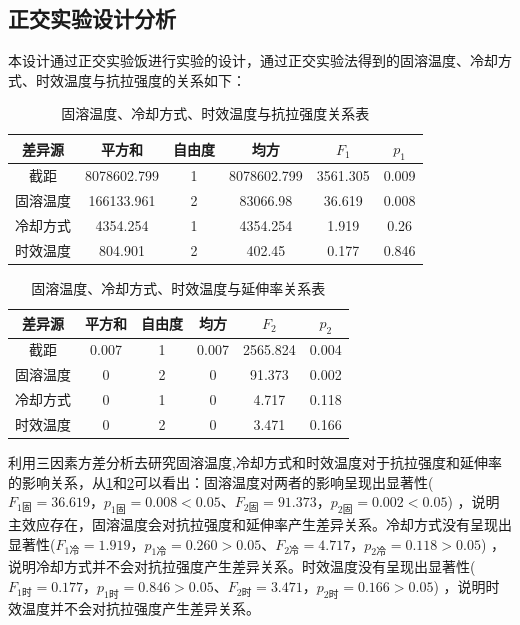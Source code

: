 \subsection{正交实验设计分析}
本设计通过正交实验饭进行实验的设计，通过正交实验法得到的固溶温度、冷却方式、时效温度与抗拉强度的关系如下：
\begin{table}[htbp]
	\centering
	\caption{固溶温度、冷却方式、时效温度与抗拉强度关系表}
	\label{sec:zjq}
	\begin{tabular}{cccccc}
		\toprule
		差异源 & 平方和 & 自由度 & 均方 & $ F_1 $ & $ p_1 $ \\
		\midrule
		截距 & 8078602.799 & 1 & 8078602.799 & 3561.305 & 0.009 \\
		固溶温度 & 166133.961 & 2 & 83066.98 & 36.619 & 0.008 \\
		冷却方式 & 4354.254 & 1 & 4354.254 & 1.919 & 0.26 \\
		时效温度 & 804.901 & 2 & 402.45 & 0.177 & 0.846 \\
		\bottomrule
	\end{tabular}
\end{table}
\begin{table}[htbp]
	\centering
	\caption{固溶温度、冷却方式、时效温度与延伸率关系表}
	\label{sec:zjy}
	\begin{tabular}{cccccc}
		\toprule
		差异源 & 平方和 & 自由度 & 均方 & $ F_2 $ & $ p_2 $ \\
		\midrule
		截距 & 0.007 & 1 & 0.007 & 2565.824 & 0.004 \\
		固溶温度 & 0 & 2 & 0 & 91.373 & 0.002 \\
		冷却方式 & 0 & 1 & 0 & 4.717 & 0.118 \\
		时效温度 & 0 & 2 & 0 & 3.471 & 0.166 \\
		\bottomrule
	\end{tabular}
\end{table}

利用三因素方差分析去研究固溶温度,冷却方式和时效温度对于抗拉强度和延伸率的影响关系，从\ref{sec:zjq}和\ref{sec:zjy}可以看出：固溶温度对两者的影响呈现出显著性($ F_{1固} =36.619，p_{1固}=0.008< 0.05 $、$ F_{2固} =91.373，p_{2固}=0.002< 0.05 $) ，说明主效应存在，固溶温度会对抗拉强度和延伸率产生差异关系。冷却方式没有呈现出显著性($ F_{1冷}=1.919，p_{1冷} =0.260>0.05 $、$ F_{2冷}=4.717，p_{2冷}=0.118>0.05 $) ，说明冷却方式并不会对抗拉强度产生差异关系。时效温度没有呈现出显著性($ F_{1时}=0.177，p_{1时}=0.846>0.05 $、$ F_{2时}=3.471，p_{2时} =0.166>0.05 $) ，说明时效温度并不会对抗拉强度产生差异关系。

